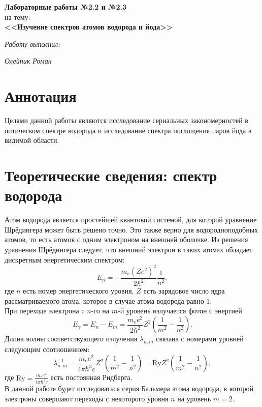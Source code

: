 \documentclass[a4paper, 12pt]{article}
\begin{document}
 
		\begin{titlepage}
		\hfill
		\vfill
			\begin{center}
				\vspace{13ex}
				\textbf{Лабораторные работы №2.2 и №2.3}
				\vspace{1ex}\\
				на тему:\\	\textbf{\Large{<<Изучение спектров атомов водорода и йода>>}}
				
				\vspace{30ex}
				\begin{flushright}
					\noindent
					\textit{Работу выполнил:}
					
					\textit{Олейник Роман}
					
				\end{flushright}
				\vfill
			\end{center}
		\end{titlepage}
		
		\newpage
\section*{Аннотация}
Целями данной работы являются исследование сериальных закономерностей в оптическом спектре водорода и исследование спектра поглощения паров йода в видимой области.
\section*{Теоретические сведения: спектр водорода}
Атом водорода является простейшей квантовой системой, для которой уравнение Шрёдингера может быть решено точно. Это также верно для водородноподобных атомов, то есть атомов с одним электроном на внешней оболочке. Из решения уравнения Шрёдингера следует, что внешний электрон в таких атомах обладает дискретным энергетическим спектром:  
	\begin{equation}
			E_n = - \frac{m_e (Z e^2)^2}{2\hbar^2}\frac{1}{n^2},
	\end{equation}
где $n$ есть номер энергетического уровня, $Z$ есть зарядовое число ядра рассматриваемого атома, которое в случае атома водорода равно 1.\\
При переходе электрона с $n$-го на $m$-й уровень излучается фотон с энергией
	\begin{equation}
		E_\gamma = E_n - E_m = \frac{m_ee^2}{2\hbar^2}Z^2\left(\frac{1}{m^2} - \frac{1}{n^2}\right).
	\end{equation}
	Длина волны  соответствующего излучения $\lambda_{n,m}$ связана с номерами уровней следующим соотношением:
	\begin{equation}
	\lambda_{n,m}^{-1} =\frac{m_ee^2}{4\pi\hbar^3c}Z^2\left(\frac{1}{m^2}-\frac{1}{n^2}\right) = \text{Ry} Z^2 \left(\frac{1}{m^2}-\frac{1}{n^2}\right),
	\end{equation}
	где $\text{Ry} = \frac{m_ee^2}{4\pi\hbar^3c}$ есть постоянная Ридберга.\\ 
	В данной работе будет исследоваться серия Бальмера атома водорода, в которой электроны совершают переходы с некоторого уровня $n$ на уровень $m = 2$.
\end{document}
